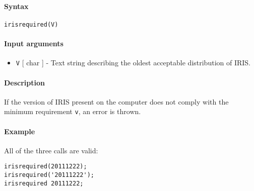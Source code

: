 


	\paragraph{Syntax}\label{syntax}

\begin{verbatim}
irisrequired(V)
\end{verbatim}

\paragraph{Input arguments}\label{input-arguments}

\begin{itemize}
\itemsep1pt\parskip0pt
\item
  \texttt{V} {[} char {]} - Text string describing the oldest acceptable
  distribution of IRIS.
\end{itemize}

\paragraph{Description}\label{description}

If the version of IRIS present on the computer does not comply with the
minimum requirement \texttt{v}, an error is thrown.

\paragraph{Example}\label{example}

All of the three calls are valid:

\begin{verbatim}
irisrequired(20111222);
irisrequired('20111222');
irisrequired 20111222;
\end{verbatim}


